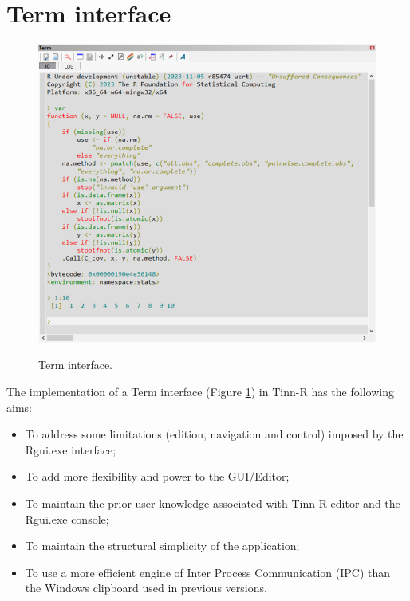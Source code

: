 
\hypertarget{working_term}{}
\section{Term interface}

\begin{figure}[H]
  \includegraphics[scale=0.35]{./res/term.png}\\
  \caption{Term interface.}
  \label{fig:term_interface}
\end{figure}

The implementation of a Term interface
(Figure \ref{fig:term_interface})
in Tinn-R has the following aims:
\begin{itemize}
  \item To address some limitations (edition, navigation and control) imposed by the Rgui.exe interface;
  \item To add more flexibility and power to the GUI/Editor;
  \item To maintain the prior user knowledge associated with Tinn-R editor and the Rgui.exe console;
  \item To maintain the structural simplicity of the application;
  \item To use a more efficient engine of Inter Process Communication (IPC)
    than the Windows clipboard used in previous versions.
\end{itemize}

